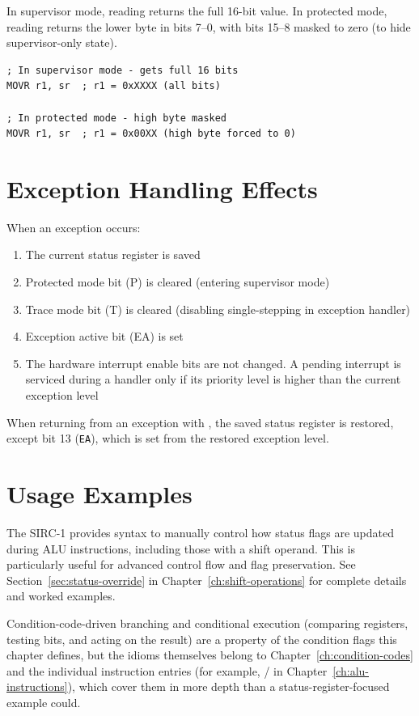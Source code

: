 In supervisor mode, reading  returns the full 16-bit value. In protected mode, reading  returns the
lower byte in bits 7--0, with bits 15--8 masked to zero (to hide supervisor-only state).

\begin{lstlisting}
; In supervisor mode - gets full 16 bits
MOVR r1, sr  ; r1 = 0xXXXX (all bits)

; In protected mode - high byte masked
MOVR r1, sr  ; r1 = 0x00XX (high byte forced to 0)
\end{lstlisting}

\section{Exception Handling Effects}

When an exception occurs:

\begin{enumerate}
	\item The current status register is saved
	\item Protected mode bit (P) is cleared (entering supervisor mode)
	\item Trace mode bit (T) is cleared (disabling single-stepping in exception handler)
	\item Exception active bit (EA) is set
	\item The hardware interrupt enable bits are not changed. A pending interrupt is serviced during a handler only if its
	      priority level is higher than the current exception level
\end{enumerate}

When returning from an exception with , the saved status register is restored, except bit 13
(\texttt{EA}), which is set from the restored exception level.

\section{Usage Examples}

The SIRC-1 provides syntax to manually control how status flags are updated during ALU instructions, including those
with a shift operand. This is particularly useful for advanced control flow and flag preservation. See
Section~\ref{sec:status-override} in Chapter~\ref{ch:shift-operations} for complete details and worked examples.

Condition-code-driven branching and conditional execution (comparing registers, testing bits, and acting on the result)
are a property of the condition flags this chapter defines, but the idioms themselves belong to
Chapter~\ref{ch:condition-codes} and the individual instruction entries (for example, /
in Chapter~\ref{ch:alu-instructions}), which cover them in more depth than a status-register-focused example could.

